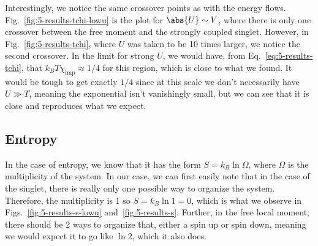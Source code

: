 Interestingly, we notice the same crossover points as with the energy flows. Fig.~\ref{fig:5-results-tchi-lowu} is the plot for $\abs{U} \sim V$, where there is only one crossover between the free moment and the strongly coupled singlet. However, in Fig.~\ref{fig:5-results-tchi}, where $U$ was taken to be 10 times larger, we notice the second crossover. In the limit for strong $U$, we would have, from Eq.~\eqref{eq:5-results-tchi}, that $k_B T \chi_{\mathrm{imp}} \approx 1/4$ for this region, which is close to what we found. It would be tough to get exactly $1/4$ since at this scale we don't necessarily have $U \gg T$, meaning the exponential isn't vanishingly small, but we can see that it is close and reproduces what we expect.


\subsection{Entropy}

In the case of entropy, we know that it has the form $S = k_B \ln\Omega$, where $\Omega$ is the multiplicity of the system. In our case, we can first easily note that in the case of the singlet, there is really only one possible way to organize the system. Therefore, the multiplicity is 1 so $S = k_B \ln 1 = 0$, which is what we observe in Figs.~\ref{fig:5-results-s-lowu} and~\ref{fig:5-results-s}. Further, in the free local moment, there should be 2 ways to organize that, either a spin up or spin down, meaning we would expect it to go like $\ln2$, which it also does.

